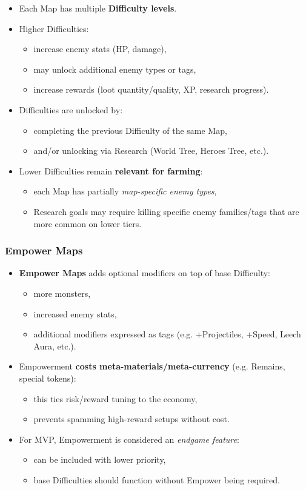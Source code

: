 \begin{itemize}
	\item Each Map has multiple \textbf{Difficulty levels}.
	\item Higher Difficulties:
	\begin{itemize}
		\item increase enemy stats (HP, damage),
		\item may unlock additional enemy types or tags,
		\item increase rewards (loot quantity/quality, XP, research progress).
	\end{itemize}
	\item Difficulties are unlocked by:
	\begin{itemize}
		\item completing the previous Difficulty of the same Map,
		\item and/or unlocking via Research (World Tree, Heroes Tree, etc.).
	\end{itemize}
	\item Lower Difficulties remain \textbf{relevant for farming}:
	\begin{itemize}
		\item each Map has partially \emph{map-specific enemy types},
		\item Research goals may require killing specific enemy families/tags that are more common on lower tiers.
	\end{itemize}
\end{itemize}

\subsubsection*{Empower Maps}

\begin{itemize}
	\item \textbf{Empower Maps} adds optional modifiers on top of base Difficulty:
	\begin{itemize}
		\item more monsters,
		\item increased enemy stats,
		\item additional modifiers expressed as tags (e.g. +Projectiles, +Speed, Leech Aura, etc.).
	\end{itemize}
	\item Empowerment \textbf{costs meta-materials/meta-currency} (e.g. Remains, special tokens):
	\begin{itemize}
		\item this ties risk/reward tuning to the economy,
		\item prevents spamming high-reward setups without cost.
	\end{itemize}
	\item For MVP, Empowerment is considered an \emph{endgame feature}:
	\begin{itemize}
		\item can be included with lower priority,
		\item base Difficulties should function without Empower being required.
	\end{itemize}
\end{itemize}

